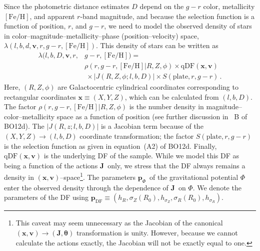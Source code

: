 \documentclass{emulateapj}
\newcommand{\eqnname}{equation}
\newcommand{\equationname}{\eqnname}
\newcommand{\feh}{\ensuremath{[\mathrm{Fe/H}]}}
\renewcommand{\vec}[1]{\ensuremath{\mathbf{#1}}}
\newcommand{\vecx}{\ensuremath{\vec{x}}}
\newcommand{\vecv}{\ensuremath{\vec{v}}}
\newcommand{\vecj}{\ensuremath{\vec{J}}}
\newcommand{\qdf}{\ensuremath{\mathrm{qDF}}}
\newcommand{\paramsdf}{\ensuremath{\vec{p}_{\mathrm{DF}}}}
\newcommand{\paramspot}{\ensuremath{\vec{p}_\Phi}}
\newcommand{\bo}{BO12}
\begin{document}
Since the photometric distance estimates $D$ depend on the $g-r$
color, metallicity \feh, and apparent $r$-band magnitude, and because
the selection function is a function of position, $r$, and $g-r$, we
need to model the observed density of stars in
color--magnitude--metallicity--phase (position--velocity) space,
$\lambda(l,b,d,\vecv,r,g-r,\feh)$. This density of stars can be
written as
\begin{equation}\label{eq:rate}
\begin{split}
\lambda(l,b,D,\vecv,r,&g-r,\feh)= \\ &
\rho(r,g-r,\feh|R,Z,\phi)\times\qdf(\vecx,\vecv) \\
& \ \times
|J(R,Z,\phi;l,b,D)| \times S(\mathrm{plate},r,g-r)\,.
\end{split}
\end{equation}
Here, $(R,Z,\phi)$ are Galactocentric cylindrical coordinates
corresponding to rectangular coordinates $\vecx\equiv(X,Y,Z)$, which
can be calculated from $(l,b,D)$. The factor
$\rho(r,g-r,\feh|R,Z,\phi)$ is the number density in
magnitude--color--metallicity space as a function of position (see
further discussion in \appendixname~B of \bo d). The $|J(R,z;l,b,D)|$
is a Jacobian term because of the $(X,Y,Z) \rightarrow (l,b,D)$
coordinate transformation; the factor $S(\mathrm{plate},r,g-r)$ is the
selection function as given in \equationname~(A2) of \bo d. Finally,
$\qdf(\vecx,\vecv)$ is the underlying DF of the sample. While we model
this DF as being a function of the actions \vecj\ only, we stress that
the DF always remains a density in
$(\vecx,\vecv)$--space\footnote{This caveat may seem unnecessary as
  the Jacobian of the canonical $(\vecx,\vecv) \rightarrow
  (\vecj,\vec{\theta})$ transformation is unity. However, because we
  cannot calculate the actions exactly, the Jacobian will not be
  exactly equal to one.}. The parameters \paramspot\ of the
gravitational potential $\Phi$ enter the observed density through the
dependence of \vecj\ on $\Phi$. We denote the parameters of the DF
using $\paramsdf \equiv (h_R,\sigma_Z(R_0), h_{\sigma_Z},
\sigma_R(R_0), h_{\sigma_R})$.
\end{document}
